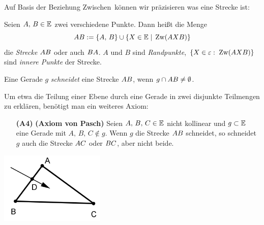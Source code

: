 

Auf Basis der Beziehung \glqq Zwischen\grqq\ können wir präzisieren was eine
Strecke ist:

\begin{defi}[Strecke]
Seien $A,\,B\in \mathbb E$ zwei verschiedene
Punkte. Dann hei{\ss}t die Menge
\[
{AB}:=\{A,\,B\}\cup\{X\in\mathbb E \; | \;\operatorname{Zw}(AXB)\}
\] 
die {\em Strecke} ${AB}$ oder auch ${BA}$. 
$A$ und $B$ sind {\em Randpunkte},
$\{X\in\varepsilon:\;\operatorname{Zw}(AXB)\}$ sind {\em innere Punkte} der Strecke.
\end{defi}


Eine Gerade $g$ \emph{schneidet} eine Strecke ${AB}$, wenn $g\cap{AB}\neq \emptyset$.


Um etwa die Teilung einer Ebene durch eine Gerade in zwei
disjunkte Teilmengen 
zu erkl\"{a}ren, 
ben\"{o}tigt man ein weiteres Axiom:



\begin{enumerate}
    \item[{\bf (A4)}] {\bf (Axiom von Pasch)} Seien $A,\,B,\,C\in\mathbb E$
    nicht kollinear und $g\subset\mathbb E$ eine Gerade mit
    $A,\,B,\,C\notin g$. Wenn $g$ die Strecke ${AB}$ schneidet, so schneidet
    $g$ auch die Strecke ${AC}$ oder ${BC}$, aber nicht
    beide. 
\end{enumerate}


\centerline{\includegraphics[width=5cm]{BILDER/1-1-04-Pasch.png}}

